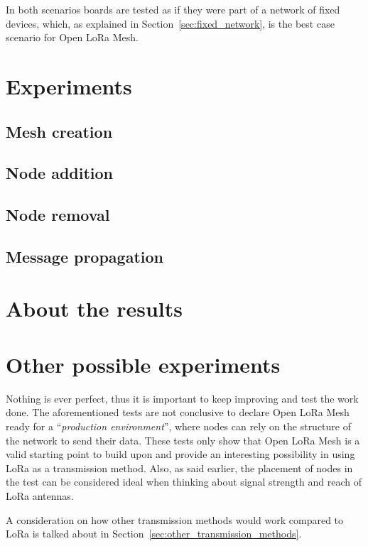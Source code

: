 		In both scenarios boards are tested as if they were part of a network of fixed devices, which, as explained in Section~\ref{sec:fixed_network}, is the best case scenario for Open LoRa Mesh.
	
	\section{Experiments}
	
		\subsection{Mesh creation}
		
		\subsection{Node addition}

		\subsection{Node removal}
		
		\subsection{Message propagation}
	
	\section{About the results}
	
	
	\section{Other possible experiments}
	
		Nothing is ever perfect, thus it is important to keep improving and test the work done.
		The aforementioned tests are not conclusive to declare Open LoRa Mesh ready for a ``\textit{production environment}'', where nodes can rely on the structure of the network to send their data.
		These tests only show that Open LoRa Mesh is a valid starting point to build upon and provide an interesting possibility in using LoRa as a transmission method.
		Also, as said earlier, the placement of nodes in the test can be considered ideal when thinking about signal strength and reach of LoRa antennas.
		
		A consideration on how other transmission methods would work compared to LoRa is talked about in Section~\ref{sec:other_transmission_methods}.